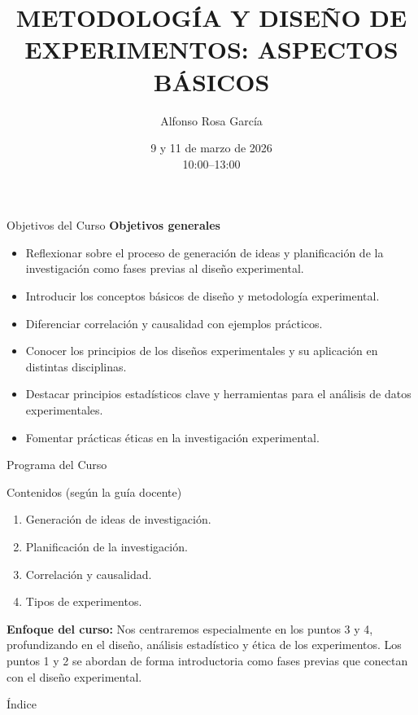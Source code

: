 ﻿\documentclass{beamer}
\title[DISEÑO DE EXPERIMENTOS]{METODOLOGÍA Y DISEÑO DE EXPERIMENTOS: ASPECTOS BÁSICOS}
\author[Alfonso Rosa García]{Alfonso Rosa García }
\institute[G9]{\textbf{Grupo de Universidades G-9}}
\date{9 y 11 de marzo de 2026 \\ 10:00--13:00}
\begin{document}
\begin{frame}
  \titlepage
\end{frame}

\begin{frame}{Objetivos del Curso}
\textbf{Objetivos generales}
\begin{itemize}
    \item Reflexionar sobre el proceso de generación de ideas y planificación de la investigación como fases previas al diseño experimental.
    \item Introducir los conceptos básicos de diseño y metodología experimental.
    \item Diferenciar correlación y causalidad con ejemplos prácticos.
    \item Conocer los principios de los diseños experimentales y su aplicación en distintas disciplinas.
    \item Destacar principios estadísticos clave y herramientas para el análisis de datos experimentales.
    \item Fomentar prácticas éticas en la investigación experimental.
\end{itemize}
\end{frame}

\begin{frame}{Programa del Curso}
   \begin{block}{Contenidos (según la guía docente)}
      \begin{enumerate}
         \item Generación de ideas de investigación.
         \item Planificación de la investigación.
         \item Correlación y causalidad.
         \item Tipos de experimentos.
      \end{enumerate}
   \end{block}
   \vspace{0.3cm}
   \textbf{Enfoque del curso:} Nos centraremos especialmente en los puntos 3 y 4, profundizando en el diseño, análisis estadístico y ética de los experimentos. Los puntos 1 y 2 se abordan de forma introductoria como fases previas que conectan con el diseño experimental.
\end{frame}

\begin{frame}{Índice}
  \tableofcontents[hideallsubsections] %
\end{frame}
\end{document}
